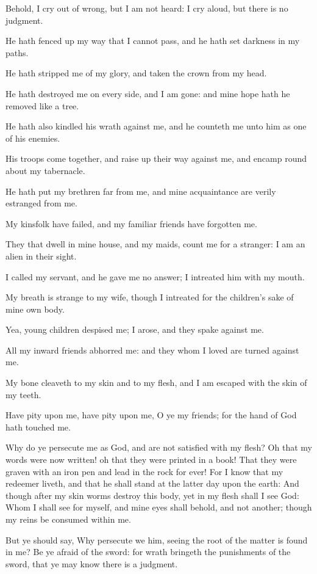\verse Behold, I cry out of wrong, but I am not heard: I cry aloud, but there is no judgment.

\verse He hath fenced up my way that I cannot pass, and he hath set darkness in my paths.

\verse He hath stripped me of my glory, and taken the crown from my head.

\verse He hath destroyed me on every side, and I am gone: and mine hope hath he removed like a tree.

\verse He hath also kindled his wrath against me, and he counteth me unto him as one of his enemies.

\verse His troops come together, and raise up their way against me, and encamp round about my tabernacle.

\verse He hath put my brethren far from me, and mine acquaintance are verily estranged from me.

\verse My kinsfolk have failed, and my familiar friends have forgotten me.

\verse They that dwell in mine house, and my maids, count me for a stranger: I am an alien in their sight.

\verse I called my servant, and he gave me no answer; I intreated him with my mouth.

\verse My breath is strange to my wife, though I intreated for the children's sake of mine own body.

\verse Yea, young children despised me; I arose, and they spake against me.

\verse All my inward friends abhorred me: and they whom I loved are turned against me.

\verse My bone cleaveth to my skin and to my flesh, and I am escaped with the skin of my teeth.

\verse Have pity upon me, have pity upon me, O ye my friends; for the hand of God hath touched me.

\verse Why do ye persecute me as God, and are not satisfied with my flesh?  \verse Oh that my words were now written! oh that they were printed in a book!  \verse That they were graven with an iron pen and lead in the rock for ever!  \verse For I know that my redeemer liveth, and that he shall stand at the latter day upon the earth: \verse And though after my skin worms destroy this body, yet in my flesh shall I see God: \verse Whom I shall see for myself, and mine eyes shall behold, and not another; though my reins be consumed within me.

\verse But ye should say, Why persecute we him, seeing the root of the matter is found in me?  \verse Be ye afraid of the sword: for wrath bringeth the punishments of the sword, that ye may know there is a judgment.


